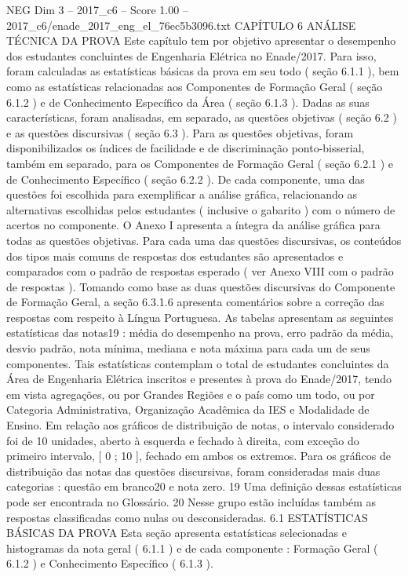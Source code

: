 \begin{textsample}{NEG Dim 3 – 2017\_c6 – Score 1.00 – 2017\_c6/enade\_2017\_eng\_el\_76ec5b3096.txt}  \label{ex:f3_neg_089}
CAPÍTULO 6 ANÁLISE TÉCNICA DA PROVA Este capítulo tem por objetivo apresentar o desempenho dos estudantes concluintes de Engenharia Elétrica no Enade/2017.
Para isso, foram calculadas as estatísticas básicas da prova em seu todo ( seção 6.1.1 ), bem como as estatísticas relacionadas aos Componentes de Formação Geral ( seção 6.1.2 ) e de Conhecimento Específico da Área ( seção 6.1.3 ).
Dadas as suas características, foram analisadas, em separado, as questões objetivas ( seção 6.2 ) e as questões discursivas ( seção 6.3 ).
Para as questões objetivas, foram disponibilizados os índices de facilidade e de discriminação ponto-bisserial, também em separado, para os Componentes de Formação Geral ( seção 6.2.1 ) e de Conhecimento Específico ( seção 6.2.2 ).
De cada componente, uma das questões foi escolhida para exemplificar a análise gráfica, relacionando as alternativas escolhidas pelos estudantes ( inclusive o gabarito ) com o número de acertos no componente.
O Anexo I apresenta a íntegra da análise gráfica para todas as questões objetivas.
Para cada uma das questões discursivas, os conteúdos dos tipos mais comuns de respostas dos estudantes são apresentados e comparados com o padrão de respostas esperado ( ver Anexo VIII com o padrão de respostas ).
Tomando como base as duas questões discursivas do Componente de Formação Geral, a seção 6.3.1.6 apresenta comentários sobre a correção das respostas com respeito à Língua Portuguesa.
As tabelas apresentam as seguintes estatísticas das notas19 : média do desempenho na prova, erro padrão da média, desvio padrão, nota mínima, mediana e nota máxima para cada um de seus componentes.
Tais estatísticas contemplam o total de estudantes concluintes da Área de Engenharia Elétrica inscritos e presentes à prova do Enade/2017, tendo em vista agregações, ou por Grandes Regiões e o país como um todo, ou por Categoria Administrativa, Organização Acadêmica da IES e Modalidade de Ensino.
Em relação aos gráficos de distribuição de notas, o intervalo considerado foi de 10 unidades, aberto à esquerda e fechado à direita, com exceção do primeiro intervalo, [ 0 ; 10 ], fechado em ambos os extremos.
Para os gráficos de distribuição das notas das questões discursivas, foram consideradas mais duas categorias : questão em branco20 e nota zero. 19 Uma definição dessas estatísticas pode ser encontrada no Glossário. 20 Nesse grupo estão incluídas também as respostas classificadas como nulas ou desconsideradas. 6.1 ESTATÍSTICAS BÁSICAS DA PROVA Esta seção apresenta estatísticas selecionadas e histogramas da nota geral ( 6.1.1 ) e de cada componente : Formação Geral ( 6.1.2 ) e Conhecimento Específico ( 6.1.3 ).

\end{textsample}
